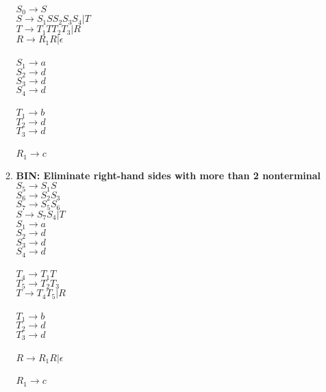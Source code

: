 \documentclass{article}
\begin{document}
\begin{enumerate}
\begin{enumerate}
				$S_0 \rightarrow S$\\
				$S \rightarrow S_1SS_2S_3S_4 | T$\\
				$T \rightarrow T_1TT_2T_3 | R$\\
				$R \rightarrow R_1R | \epsilon$\\\\
				$S_1 \rightarrow a$\\
				$S_2 \rightarrow d$\\$S_3 \rightarrow d$\\$S_4 \rightarrow d$\\\\
				$T_1 \rightarrow b$\\ $T_2 \rightarrow d$\\$T_3 \rightarrow d$\\\\
				$R_1 \rightarrow c$\\
				
			\item \textbf{BIN: Eliminate right-hand sides with more than 2 nonterminal }\\
				$S_5 \rightarrow S_1S$\\
				$S_6 \rightarrow S_2S_3$\\
				$S_7 \rightarrow S_5S_6$\\
				$S \rightarrow S_7S_4 | T$\\

				$S_1 \rightarrow a$\\
				$S_2 \rightarrow d$\\$S_3 \rightarrow d$\\$S_4 \rightarrow d$\\\\

				$T_4 \rightarrow T_1T$\\
				$T_5 \rightarrow T_2T_3$\\
				$T \rightarrow T_4T_5 | R$\\\\

				$T_1 \rightarrow b$\\ $T_2 \rightarrow d$\\$T_3 \rightarrow d$\\\\

				$R \rightarrow R_1R | \epsilon$\\\\
				$R_1 \rightarrow c$\\


\end{enumerate}
\end{enumerate}
\end{document}
